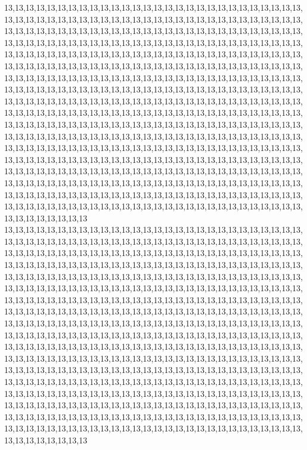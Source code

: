 13,13,13,13,13,13,13,13,13,13,13,13,13,13,13,13,13,13,13,13,13,13,13,13,13,13,13,13,13,13,13,13,13,13,13,13,13,13,13,13,13,13,13,13,13,13,13,13,13,13,13,13,13,13,13,13,13,13,13,13,13,13,13,13,13,13,13,13,13,13,13,13,13,13,13,13,13,13,13,13,13,13,13,13,13,13,13,13,13,13,13,13,13,13,13,13,13,13,13,13,13,13,13,13,13,13,13,13,13,13,13,13,13,13,13,13,13,13,13,13,13,13,13,13,13,13,13,13,13,13,13,13,13,13,13,13,13,13,13,13,13,13,13,13,13,13,13,13,13,13,13,13,13,13,13,13,13,13,13,13,13,13,13,13,13,13,13,13,13,13,13,13,13,13,13,13,13,13,13,13,13,13,13,13,13,13,13,13,13,13,13,13,13,13,13,13,13,13,13,13,13,13,13,13,13,13,13,13,13,13,13,13,13,13,13,13,13,13,13,13,13,13,13,13,13,13,13,13,13,13,13,13,13,13,13,13,13,13,13,13,13,13,13,13,13,13,13,13,13,13,13,13,13,13,13,13,13,13,13,13,13,13,13,13,13,13,13,13,13,13,13,13,13,13,13,13,13,13,13,13,13,13,13,13,13,13,13,13,13,13,13,13,13,13,13,13,13,13,13,13,13,13,13,13,13,13,13,13,13,13,13,13,13,13,13,13,13,13,13,13,13,13,13,13,13,13,13,13,13,13,13,13,13,13,13,13,13,13,13,13,13,13,13,13,13,13,13,13,13,13,13,13,13,13,13,13,13,13,13,13,13,13,13,13,13,13,13,13,13,13,13,13,13,13,13,13,13,13,13,13,13,13,13,13,13,13,13,13,13,13,13,13,13,13,13,13,13,13,13,13,13,13,13,13,13,13,13,13,13,13,13,13,13,13,13,13,13,13,13,13,13,13,13,13,13,13,13,13,13,13,13,13,13,13,13,13,13,13,13,13,13,13,13,13,13,13,13,13,13,13,13,13,13,13,13,13,13,13,13,13,13,13,13,13,13,13,13,13,13,13,13,13,13,13,13,13,13,13,13,13,13,13,13,13,13,13,13,13,13,13,13,13,13,13,13,13,13,13,13,13,13,13,13,13,13,13,13,13,13,13,13,13
13,13,13,13,13,13,13,13,13,13,13,13,13,13,13,13,13,13,13,13,13,13,13,13,13,13,13,13,13,13,13,13,13,13,13,13,13,13,13,13,13,13,13,13,13,13,13,13,13,13,13,13,13,13,13,13,13,13,13,13,13,13,13,13,13,13,13,13,13,13,13,13,13,13,13,13,13,13,13,13,13,13,13,13,13,13,13,13,13,13,13,13,13,13,13,13,13,13,13,13,13,13,13,13,13,13,13,13,13,13,13,13,13,13,13,13,13,13,13,13,13,13,13,13,13,13,13,13,13,13,13,13,13,13,13,13,13,13,13,13,13,13,13,13,13,13,13,13,13,13,13,13,13,13,13,13,13,13,13,13,13,13,13,13,13,13,13,13,13,13,13,13,13,13,13,13,13,13,13,13,13,13,13,13,13,13,13,13,13,13,13,13,13,13,13,13,13,13,13,13,13,13,13,13,13,13,13,13,13,13,13,13,13,13,13,13,13,13,13,13,13,13,13,13,13,13,13,13,13,13,13,13,13,13,13,13,13,13,13,13,13,13,13,13,13,13,13,13,13,13,13,13,13,13,13,13,13,13,13,13,13,13,13,13,13,13,13,13,13,13,13,13,13,13,13,13,13,13,13,13,13,13,13,13,13,13,13,13,13,13,13,13,13,13,13,13,13,13,13,13,13,13,13,13,13,13,13,13,13,13,13,13,13,13,13,13,13,13,13,13,13,13,13,13,13,13,13,13,13,13,13,13,13,13,13,13,13,13,13,13,13,13,13,13,13,13,13,13,13,13,13,13,13,13,13,13,13,13,13,13,13,13,13,13,13,13,13,13,13,13,13,13,13,13,13,13,13,13,13,13,13,13,13,13,13,13,13,13,13,13,13,13,13,13,13,13,13,13,13,13,13,13,13,13,13,13,13,13,13,13,13,13,13,13,13,13,13,13,13,13,13,13,13,13,13,13,13,13,13,13,13,13,13,13,13,13,13,13,13,13,13,13,13,13,13,13,13,13,13,13,13,13,13,13,13,13,13,13,13,13,13,13,13,13,13,13,13,13,13,13,13,13,13,13,13,13,13,13,13,13,13,13,13,13,13,13,13,13,13,13,13,13,13,13,13,13,13,13,13,13,13,13,13,13,13,13,13,13,13,13,13,13
